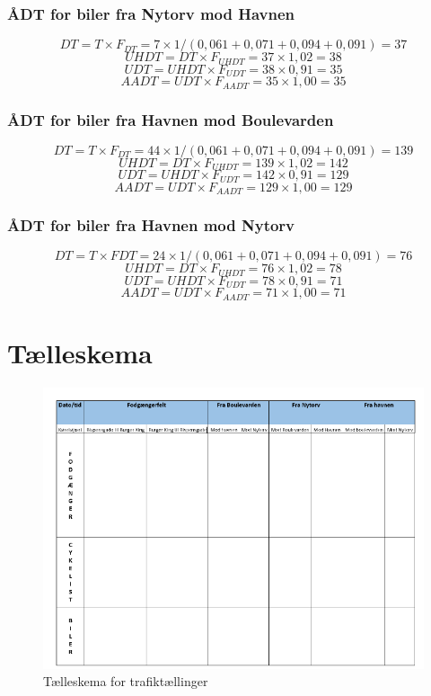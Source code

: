 \subsection{ ÅDT for biler fra Nytorv mod Havnen}
\label{sub:cykelaadtnytorvj}

  $$DT = T \times F_{DT} = 7 \times 1/(0,061 + 0,071 + 0,094 + 0,091) = 37$$
  $$UHDT = DT \times F_{UHDT} = 37 \times 1,02 = 38$$
  $$UDT = UHDT \times F_{UDT} = 38 \times 0,91 = 35$$
  $$AADT = UDT \times F_{AADT} = 35 \times 1,00 = 35$$

\subsection{ ÅDT for biler fra Havnen mod Boulevarden}
\label{sub:cykelaadtnytorvk}

  $$DT = T \times F_{DT} = 44 \times 1/(0,061 + 0,071 + 0,094 + 0,091) = 139$$
  $$UHDT = DT \times F_{UHDT} = 139 \times 1,02 = 142$$
  $$UDT = UHDT \times F_{UDT} = 142 \times 0,91 = 129$$
  $$AADT = UDT \times F_{AADT} = 129 \times 1,00 = 129$$

\subsection{ ÅDT for biler fra Havnen mod Nytorv}
\label{sub:cykelaadtnytorvl}

  $$DT = T \times FDT = 24 \times 1/(0,061 + 0,071 + 0,094 + 0,091) = 76$$
  $$UHDT = DT \times F_{UHDT} = 76 \times 1,02 = 78$$
  $$UDT = UHDT \times F_{UDT} = 78 \times 0,91 = 71$$
  $$AADT = UDT \times F_{AADT} = 71 \times 1,00 = 71$$

  \chapter{Tælleskema}
    \label{chap:talskem}
    \begin{figure}[htbp]
      \centering
      \begin{adjustbox}{max width=\textwidth}
        \includegraphics[scale=0.6]{figures/Billederogfigur/tabelp.png}
     \end{adjustbox}
      \caption{Tælleskema for trafiktællinger}
      \label{fig:tft}
    \end{figure}
